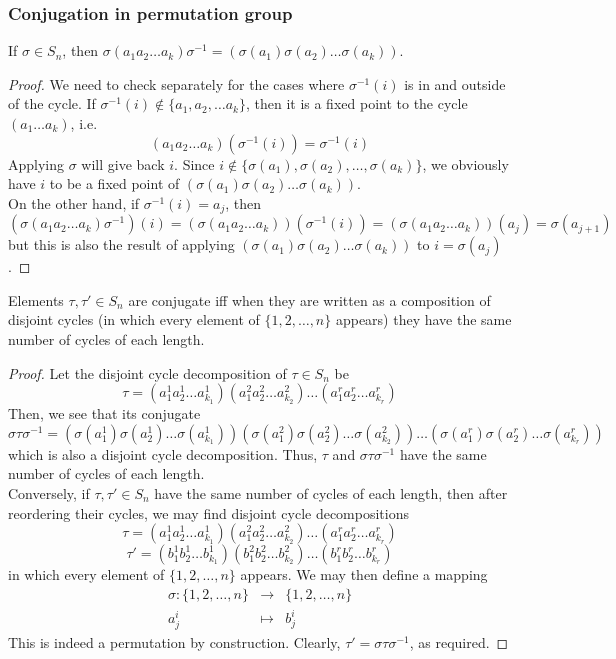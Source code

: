 \documentclass[a4paper]{article}
\begin{document}
\subsubsection{Conjugation in permutation group}
\begin{prop}
If $\sigma\in S_n$, then $\sigma(a_1a_2\dots a_k)\sigma^{-1}=(\sigma(a_1)\sigma(a_2)\dots\sigma(a_k))$.
\end{prop}
\begin{proof}
We need to check separately for the cases where $\sigma^{-1}(i)$ is in and outside of the cycle. If $\sigma^{-1}(i)\notin\{a_1,a_2,\dots a_k\}$, then it is a fixed point to the cycle $(a_1\dots a_k)$, i.e.
$$(a_1a_2\dots a_k)(\sigma^{-1}(i))=\sigma^{-1}(i)$$
Applying $\sigma$ will give back $i$. Since $i\notin\{\sigma(a_1),\sigma(a_2),\dots,\sigma(a_k)\}$, we obviously have $i$ to be a fixed point of $(\sigma(a_1)\sigma(a_2)\dots\sigma(a_k))$.\\[5pt]
On the other hand, if $\sigma^{-1}(i)=a_j$, then 
$$(\sigma(a_1a_2\dots a_k)\sigma^{-1})(i)=(\sigma(a_1a_2\dots a_k))(\sigma^{-1}(i))=(\sigma(a_1a_2\dots a_k))(a_j)=\sigma(a_{j+1})$$
but this is also the result of applying $(\sigma(a_1)\sigma(a_2)\dots\sigma(a_k))$ to $i=\sigma(a_j)$.
\end{proof}
\begin{cor}
Elements $\tau,\tau'\in S_n$ are conjugate iff when they are written as a composition of disjoint cycles (in which every element of $\{1,2,\dots,n\}$ appears) they have the same number of cycles of each length.
\end{cor}
\begin{proof}
Let the disjoint cycle decomposition of $\tau\in S_n$ be
$$\tau=(a_1^1a_2^1\dots a_{k_1}^1)(a_1^2a_2^2\dots a_{k_2}^2)\dots (a_1^ra_2^r\dots a_{k_r}^r)$$
Then, we see that its conjugate
$$\sigma\tau\sigma^{-1}=(\sigma(a_1^1)\sigma(a_2^1)\dots\sigma(a_{k_1}^1))(\sigma(a_1^2)\sigma(a_2^2)\dots\sigma(a_{k_2}^2))\dots(\sigma(a_1^r)\sigma(a_2^r)\dots\sigma(a_{k_r}^r))$$
which is also a disjoint cycle decomposition. Thus, $\tau$ and $\sigma\tau\sigma^{-1}$ have the same number of cycles of each length.\\[5pt]
Conversely, if $\tau,\tau'\in S_n$ have the same number of cycles of each length, then after reordering their cycles, we may find disjoint cycle decompositions
$$\tau=(a_1^1a_2^1\dots a_{k_1}^1)(a_1^2a_2^2\dots a_{k_2}^2)\dots(a_1^ra_2^r\dots a_{k_r}^r)$$
$$\tau'=(b_1^1b_2^1\dots b_{k_1}^1)(b_1^2b_2^2\dots b_{k_2}^2)\dots(b_1^rb_2^r\dots b_{k_r}^r)$$
in which every element of $\{1,2,\dots,n\}$ appears. We may then define a mapping 
\begin{eqnarray}
\sigma:\{1,2,\dots,n\}&\rightarrow&\{1,2,\dots,n\}\nonumber\\a_j^i&\mapsto& b_j^i\nonumber
\end{eqnarray}
This is indeed a permutation by construction. Clearly, $\tau'=\sigma\tau\sigma^{-1}$, as required.
\end{proof}
\end{document}
